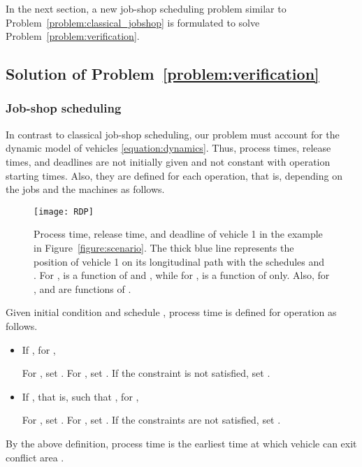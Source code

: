\documentclass{sig-alternate}
\begin{document}
In the next section, a new job-shop scheduling problem similar to Problem~\ref{problem:classical_jobshop} is formulated to solve Problem~\ref{problem:verification}. 


\subsection{Solution of Problem~\ref{problem:verification}}\label{section:verification_solution}


\subsubsection{Job-shop scheduling}\label{section:job-shop}
 In contrast to classical job-shop scheduling, our problem must account for the dynamic model of vehicles \eqref{equation:dynamics}. Thus, process times, release times, and deadlines are not initially given and not constant with operation starting times. Also, they are defined for each operation, that is, depending on the jobs and the machines as follows.

	\begin{figure}[tb!]
	\centering
	\texttt{[image: RDP]}
	\caption{Process time, release time, and deadline of vehicle 1 in the example in Figure~\ref{figure:scenario}. The thick blue line represents the position of vehicle 1 on its longitudinal path with the schedules  and . For ,  is a function of  and , while for ,  is a function of  only. Also, for ,  and  are functions of .}
	\label{figure:RDP}
	\end{figure}
	

\begin{definition}\label{definition:job-shop}
	Given initial condition  and schedule , process time  is defined for operation  as follows.
	
	\begin{itemize}
		\item If , for , 
		
		For , set . For , set . If the constraint is not satisfied, set .
		\item If , that is,  such that , for ,
		
		For , set . For , set . If the constraints are not satisfied, set .
	\end{itemize}
\end{definition}
By the above definition, process time  is the earliest time at which vehicle  can exit conflict area .
\end{document}
